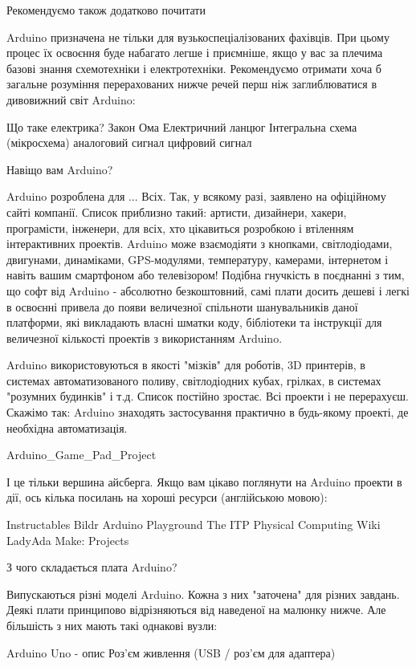 \documentclass[12pt,a4paper]{report}  %
\begin{document}
Рекомендуємо також додатково почитати

Arduino призначена не тільки для вузькоспеціалізованих фахівців. При цьому процес їх освоєння буде набагато легше і приємніше, якщо у вас за плечима базові знання схемотехніки і електротехніки. Рекомендуємо отримати хоча б загальне розуміння перерахованих нижче речей перш ніж заглиблюватися в дивовижний світ Arduino:

    Що таке електрика?
    Закон Ома
    Електричний ланцюг
    Інтегральна схема (мікросхема)
    аналоговий сигнал
    цифровий сигнал

Навіщо вам Arduino?

Arduino розроблена для ... Всіх. Так, у всякому разі, заявлено на офіційному сайті компанії. Список приблизно такий: артисти, дизайнери, хакери, програмісти, інженери, для всіх, хто цікавиться розробкою і втіленням інтерактивних проектів. Arduino може взаємодіяти з кнопками, світлодіодами, двигунами, динаміками, GPS-модулями, температуру, камерами, інтернетом і навіть вашим смартфоном або телевізором! Подібна гнучкість в поєднанні з тим, що софт від Arduino - абсолютно безкоштовний, самі плати досить дешеві і легкі в освоєнні привела до появи величезної спільноти шанувальників даної платформи, які викладають власні шматки коду, бібліотеки та інструкції для величезної кількості проектів з використанням Arduino.

Arduino використовуються в якості "мізків" для роботів, 3D принтерів, в системах автоматизованого поливу, світлодіодних кубах, грілках, в системах "розумних будинків" і т.д. Список постійно зростає. Всі проекти і не перерахуєш. Скажімо так: Arduino знаходять застосування практично в будь-якому проекті, де необхідна автоматизація.

Arduino\_Game\_Pad\_Project

І це тільки вершина айсберга. Якщо вам цікаво поглянути на Arduino проекти в дії, ось кілька посилань на хороші ресурси (англійською мовою):

    Instructables
    Bildr
    Arduino Playground
    The ITP Physical Computing Wiki
    LadyAda
    Make: Projects

З чого складається плата Arduino?

Випускаються різні моделі Arduino. Кожна з них "заточена" для різних завдань. Деякі плати принципово відрізняються від наведеної на малюнку нижче. Але більшість з них мають такі однакові вузли:

Arduino Uno - опис
Роз'єм живлення (USB / роз'єм для адаптера)
\end{document}
